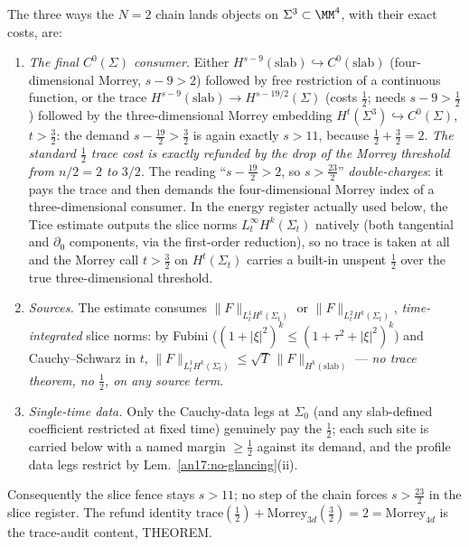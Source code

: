 \begin{remark}
\label{an17:refund}
The three ways the $N{=}2$ chain lands objects on $\Sigma^3\subset\MM^4$, with
their exact costs, are:
\begin{enumerate}[label=\textup{(\alph*)},leftmargin=*,nosep]
\item \emph{The final $C^0(\Sigma)$ consumer.} Either
  $H^{s-9}(\mathrm{slab})\hookrightarrow C^0(\mathrm{slab})$ (four-dimensional
  Morrey, $s-9>2$) followed by free restriction of a continuous function, or
  the trace $H^{s-9}(\mathrm{slab})\to H^{s-19/2}(\Sigma)$ (costs $\tfrac12$;
  needs $s-9>\tfrac12$) followed by the three-dimensional Morrey embedding
  $H^{t}(\Sigma^3)\hookrightarrow C^0(\Sigma)$, $t>\tfrac32$: the demand
  $s-\tfrac{19}2>\tfrac32$ is again exactly $s>11$, because
  $\tfrac12+\tfrac32=2$. \emph{The standard $\tfrac12$ trace cost is exactly
  refunded by the drop of the Morrey threshold from $n/2=2$ to $3/2$.} The
  reading ``$s-\tfrac{19}2>2$, so $s>\tfrac{23}2$'' \emph{double-charges}: it
  pays the trace and then demands the four-dimensional Morrey index of a
  three-dimensional consumer. In the energy register actually used below, the
  Tice estimate outputs the slice norms $L^\infty_t H^{k}(\Sigma_t)$ natively
  (both tangential and $\partial_0$ components, via the first-order reduction),
  so no trace is taken at all and the Morrey call $t>\tfrac32$ on
  $H^{t}(\Sigma_t)$ carries a built-in unspent $\tfrac12$ over the true
  three-dimensional threshold.
\item \emph{Sources.} The estimate consumes $\|F\|_{L^1_t H^k(\Sigma_t)}$ or
  $\|F\|_{L^2_t H^k(\Sigma_t)}$, \emph{time-integrated} slice norms: by Fubini
  ($(1+|\xi|^2)^k\le(1+\tau^2+|\xi|^2)^k$) and Cauchy--Schwarz in $t$,
  $\|F\|_{L^1_t H^k(\Sigma_t)}\le\sqrt T\,\|F\|_{H^k(\mathrm{slab})}$ ---
  \emph{no trace theorem, no $\tfrac12$, on any source term}.
\item \emph{Single-time data.} Only the Cauchy-data legs at $\Sigma_0$ (and any
  slab-defined coefficient restricted at fixed time) genuinely pay the
  $\tfrac12$; each such site is carried below with a named margin $\ge\tfrac12$
  against its demand, and the profile data legs restrict by
  Lem.~\ref{an17:no-glancing}(ii).
\end{enumerate}
Consequently the slice fence stays $s>11$; no step of the chain forces
$s>\tfrac{23}2$ in the slice register. The refund identity
$\mathrm{trace}(\tfrac12)+\mathrm{Morrey}_{3d}(\tfrac32)=2=\mathrm{Morrey}_{4d}$
is the trace-audit content, THEOREM.
\end{remark}

